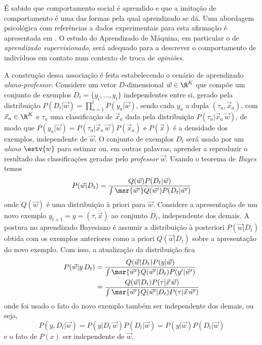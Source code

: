 É sabido que comportamento social é aprendido e que a imitação de comportamento
é uma das formas pela qual aprendizado se dá. Uma abordagem psicológica com
referências a dados experimentais para esta afirmação é apresentada em
\parencite{Haidt2007}.  O estudo do Aprendizado de Máquina, em particular o de
\emph{aprendizado supervisionado}, será adequado para a descrever o
comportamento de indivíduos em contato num contexto de troca de \emph{opiniões}.

\newcommand{\Dt}{\ensuremath{D_t}} \newcommand{\rl}{\ensuremath{\vec{w}}}
\newcommand{\wt}{\ensuremath{\estv{w}}} \newcommand{\wT}{\ensuremath{\wt_+}} A
construção dessa associação é feita estabelecendo o cenário de aprendizado
\emph{aluno-professor}.  Considere um vetor $D$-dimensional $\rl \in \R^K$ que
compõe um conjunto de exemplos $\Dt = \{y_i,\dots,y_t\}$ independentes entre si,
gerado pela distribuição $P(\Dt|\rl) = \prod_{a=1}^t P(y_a|\rl)$, sendo cada
$y_a$ a dupla $(\tau_a, \vec{x}_a)$, com $\vec{x}_a \in \R^K$ e $\tau_a$ uma
classificação de $\vec{x}_a$ dada pela distribuição $P(\tau_a|\vec{x}_a\,\rl)$,
de modo que $P(y_a|\rl)=P(\tau_a|\vec{x}_a\,\rl)P(\vec{x}_a)$ e $P(\vec{x})$ é a
densidade dos exemplos, independente de $\rl$.  O conjunto de exemplos $\Dt$
será usado por um \emph{aluno} $\wt$ para estimar ou, em outras palavras,
aprender a reproduzir o resultado das classificações geradas pelo
\emph{professor} $\rl$.  Usando o teorema de \emph{Bayes} temos
\begin{equation}\label{eq:bayes}
  P(\rl|\Dt) = \frac{Q(\rl)P(\Dt|\rl)}
                    {\int \msr{\rl'} Q(\rl')P(\Dt|\rl')}
\end{equation}
onde $Q(\rl)$ é uma distribuição à priori para \rl.  Considere a apresentação de
um novo exemplo $y_{t+1}=y=(\tau,\vec{x})$ ao conjunto $\Dt$, independente dos
demais.  A postura no aprendizado Bayesiano é assumir a distribuição à
posteriori $P(\rl|\Dt)$ obtida com os exemplos anteriores como a priori
$Q(\rl|\Dt)$ sobre a apresentação do novo exemplo. Com isso, a atualização da
distribuição fica
\begin{align}\label{eq:bayes-update}
  P(\rl|y\,\Dt) & = \frac{Q(\rl|\Dt)P(y|\rl)}
                         {\int \msr{\rl'} Q(\rl'|\Dt)P(y'|\rl')} \\
  & = \frac{Q(\rl|\Dt)P(\tau|\vec{x}\,\rl)}
           {\int \msr{\rl'} Q(\rl'|\Dt)P(\tau|\vec{x}\,\rl')}
\end{align}
onde foi usado o fato do novo exemplo também ser independente dos demais, ou seja,
\[
P(y,\Dt|\rl) =
P(y|\Dt\,\rl)P(\Dt|\rl) =
P(y|\rl)P(\Dt|\rl)
\]
e o fato de $P(x)$ ser independente de $\rl$.


